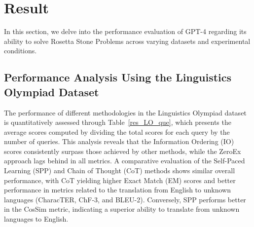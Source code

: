 \documentclass[10pt, a4paper]{article}
\begin{document}





\section{Result}
In this section, we delve into the performance evaluation of GPT-4 regarding its ability to solve Rosetta Stone Problems across varying datasets and experimental conditions.
\subsection{Performance Analysis Using the Linguistics Olympiad Dataset}
The performance of different methodologies in the Linguistics Olympiad dataset is quantitatively assessed through Table~\ref{res_LO_que}, which presents the average scores computed by dividing the total scores for each query by the number of queries. This analysis reveals that the Information Ordering (IO) scores consistently surpass those achieved by other methods, while the ZeroEx approach lags behind in all metrics. A comparative evaluation of the Self-Paced Learning (SPP) and Chain of Thought (CoT) methods shows similar overall performance, with CoT yielding higher Exact Match (EM) scores and better performance in metrics related to the translation from English to unknown languages (CharacTER, ChF-3, and BLEU-2). Conversely, SPP performs better in the CosSim metric, indicating a superior ability to translate from unknown languages to English.
\end{document}
